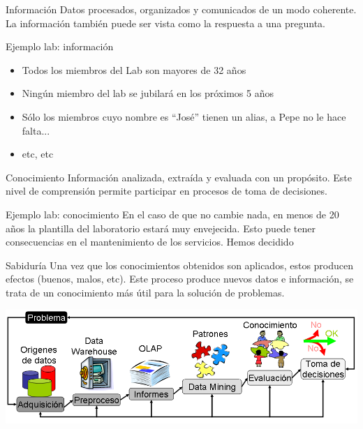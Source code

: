 \documentclass{classes/beamer_GeomaticaUA}
\begin{document}
\begin{frame}{Información}
Datos procesados, organizados y comunicados de un modo coherente. La información también puede ser vista como la respuesta a una pregunta.

\begin{exampleblock}{Ejemplo lab: información}
\begin{itemize}
\item Todos los miembros del Lab son mayores de 32 años
\item Ningún miembro del lab se jubilará en los próximos 5 años
\item Sólo los miembros cuyo nombre es ``José'' tienen un alias, a Pepe no le hace falta...
\item etc, etc
\end{itemize}
\end{exampleblock}

\end{frame}

\begin{frame}{Conocimiento}
Información analizada, extraída y evaluada con un propósito. Este nivel de comprensión permite participar en procesos de toma de decisiones.

\begin{exampleblock}{Ejemplo lab: conocimiento}
En el caso de que no cambie nada, en menos de 20 años la plantilla del laboratorio estará muy envejecida. Esto puede tener consecuencias en el mantenimiento de los servicios. Hemos decidido
\end{exampleblock}

\end{frame}

\begin{frame}{Sabiduría}
Una vez que los conocimientos obtenidos son aplicados, estos producen efectos (buenos, malos, etc). Este proceso produce nuevos datos e información, se trata de un conocimiento más útil para la solución de problemas.

\vspace{1cm}

\includegraphics[width=\textwidth]{images/proceso_KDD_mio.png} 

\end{frame}
\end{document}
